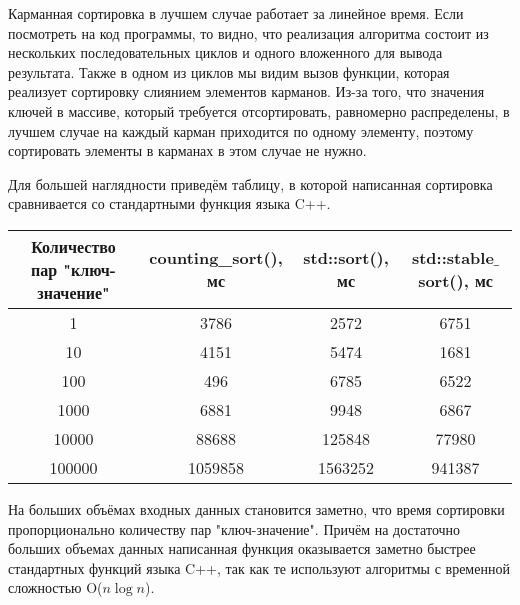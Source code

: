 \documentclass[12pt]{article}
\begin{document}
Карманная сортировка в лучшем случае работает за линейное время. Если посмотреть на код программы, то видно, что реализация алгоритма состоит из нескольких последовательных циклов и одного вложенного для вывода результата. Также в одном из циклов мы видим вызов функции, которая реализует сортировку слиянием элементов карманов. Из-за того, что значения ключей в массиве, который требуется отсортировать, равномерно распределены, в лучшем случае на каждый карман приходится по одному элементу, поэтому сортировать элементы в карманах в этом случае не нужно.

Для большей наглядности приведём таблицу, в которой написанная сортировка сравнивается со стандартными функция языка C++.

\begin{center}
\begin{tabular}{ |c|c|c|c| }
    \hline
    Количество пар "ключ-значение" & counting\_sort(), мс & std::sort(), мс & std::stable$\_$sort(), мс \\
    \hline
    1 & 3786 & 2572 & 6751 \\
    10 & 4151 & 5474 & 1681 \\
    100 & 496 & 6785 & 6522 \\
    1000 & 6881 & 9948 & 6867 \\
    10000 & 88688 & 125848 & 77980 \\
    100000 & 1059858 & 1563252 & 941387 \\
    \hline
    \end{tabular}
\end{center}

На больших объёмах входных данных становится заметно, что время сортировки пропорционально количеству пар "ключ-значение". Причём на достаточно больших объемах данных написанная функция оказывается заметно быстрее стандартных функций языка C++, так как те используют алгоритмы с временной сложностью O($n \log{n}$).
\end{document}

